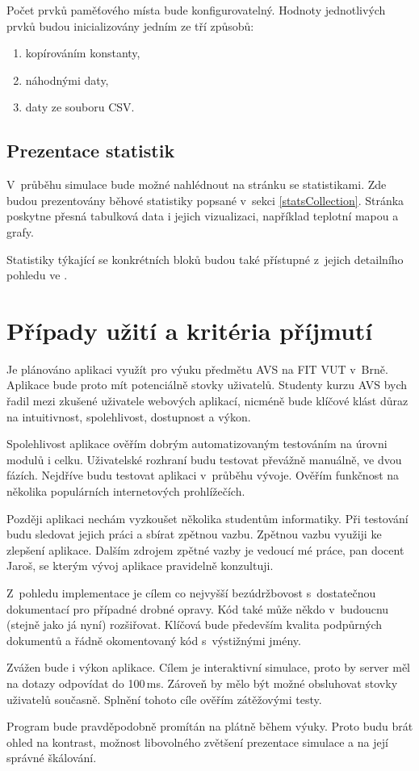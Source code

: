 Počet prvků paměťového místa bude konfigurovatelný.
Hodnoty jednotlivých prvků budou inicializovány jedním ze tří způsobů:
\begin{enumerate}
    \item kopírováním konstanty,
    \item náhodnými daty,
    \item daty ze souboru CSV.
\end{enumerate}

\subsection{Prezentace statistik}

V~průběhu simulace bude možné nahlédnout na stránku se statistikami.
Zde budou prezentovány běhové statistiky popsané v~sekci \ref{statsCollection}.
Stránka poskytne přesná tabulková data i jejich vizualizaci, například teplotní mapou a grafy. 

Statistiky týkající se konkrétních bloků budou také přístupné z~jejich detailního pohledu ve . 

\section{Případy užití a kritéria příjmutí}

Je plánováno aplikaci využít pro výuku předmětu AVS na FIT VUT v~Brně.
Aplikace bude proto mít potenciálně stovky uživatelů.
Studenty kurzu AVS bych řadil mezi zkušené uživatele webových aplikací, nicméně bude klíčové klást důraz na intuitivnost, spolehlivost, dostupnost a výkon.

Spolehlivost aplikace ověřím dobrým automatizovaným testováním na úrovni modulů i celku.
Uživatelské rozhraní budu testovat převážně manuálně, ve dvou fázích.
Nejdříve budu testovat aplikaci v~průběhu vývoje.
Ověřím funkčnost na několika populárních internetových prohlížečích.

Později aplikaci nechám vyzkoušet několika studentům informatiky.
Při testování budu sledovat jejich práci a sbírat zpětnou vazbu.
Zpětnou vazbu využiji ke zlepšení aplikace.
Dalším zdrojem zpětné vazby je vedoucí mé práce, pan docent Jaroš, se kterým vývoj aplikace pravidelně konzultuji. 

Z~pohledu implementace je cílem co nejvyšší bezúdržbovost s~dostatečnou dokumentací pro případné drobné opravy.
Kód také může někdo v~budoucnu (stejně jako já nyní) rozšiřovat.
Klíčová bude především kvalita podpůrných dokumentů a řádně okomentovaný kód s~výstižnými jmény.

Zvážen bude i výkon aplikace.
Cílem je interaktivní simulace, proto by server měl na dotazy odpovídat do 100\,ms.
Zároveň by mělo být možné obsluhovat stovky uživatelů současně.
Splnění tohoto cíle ověřím zátěžovými testy.

Program bude pravděpodobně promítán na plátně během výuky.
Proto budu brát ohled na kontrast, možnost libovolného zvětšení prezentace simulace a na její správné škálování.
